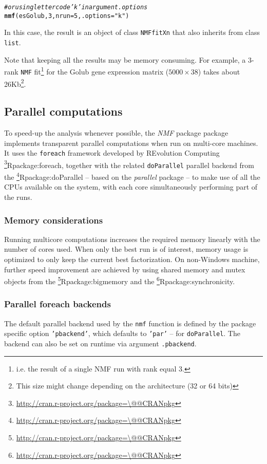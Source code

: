 \documentclass[a4paper]{article}\usepackage[]{graphicx}\usepackage[]{color}
\makeatletter
\newcommand{\hlnum}[1]{\textcolor[rgb]{0.686,0.059,0.569}{#1}}%
\newcommand{\hlstr}[1]{\textcolor[rgb]{0.192,0.494,0.8}{#1}}%
\newcommand{\hlcom}[1]{\textcolor[rgb]{0.678,0.584,0.686}{\textit{#1}}}%
\newcommand{\hlstd}[1]{\textcolor[rgb]{0.345,0.345,0.345}{#1}}%
\newcommand{\hlkwc}[1]{\textcolor[rgb]{0.333,0.667,0.333}{#1}}%
\newcommand{\hlkwd}[1]{\textcolor[rgb]{0.737,0.353,0.396}{\textbf{#1}}}%
\newenvironment{kframe}{%
 \def\at@end@of@kframe{}%
 \ifinner\ifhmode%
  \def\at@end@of@kframe{\end{minipage}}%
  \begin{minipage}{\columnwidth}%
 \fi\fi%
 \def\FrameCommand##1{\hskip\@totalleftmargin \hskip-\fboxsep
 \colorbox{shadecolor}{##1}\hskip-\fboxsep
     \hskip-\linewidth \hskip-\@totalleftmargin \hskip\columnwidth}%
 \MakeFramed {\advance\hsize-\width
   \@totalleftmargin\z@ \linewidth\hsize
   \@setminipage}}%
 {\par\unskip\endMakeFramed%
 \at@end@of@kframe}
\newenvironment{knitrout}{}{} %
\let\code=\texttt
\newcommand{\pkgname}[1]{\textit{#1}\xspace}
\newcommand{\Rpkg}[1]{\pkgname{#1} package\xspace}
\newcommand{\CRANurl}[1]{\url{http://cran.r-project.org/package=#1}}
\def\CRANpkg{\@ifstar\@CRANpkg\@@CRANpkg}
\def\@CRANpkg#1{\href{http://cran.r-project.org/package=#1}{\pkgname{#1}}\footnote{\CRANurl{#1}}}
\def\@@CRANpkg#1{\href{http://cran.r-project.org/package=#1}{\pkgname{#1}} package\footnote{\CRANurl{#1}}}
\def\citeCRANpkg{\@ifstar\@citeCRANpkg\@@citeCRANpkg}
\def\@citeCRANpkg#1{\CRANpkg{#1}\cite*{Rpackage:#1}}
\def\@@citeCRANpkg#1{\CRANpkg{#1}~\cite{Rpackage:#1}}
\newcommand{\nmfpack}{\Rpkg{NMF}}
\renewcommand{\cite}[1]{\parencite{#1}}
\makeatother
\begin{document}
\begin{knitrout}
\color{fgcolor}\begin{kframe}
\begin{alltt}
\hlcom{# or using letter code 'k' in argument .options}
\hlkwd{nmf}\hlstd{(esGolub,} \hlnum{3}\hlstd{,} \hlkwc{nrun} \hlstd{=} \hlnum{5}\hlstd{,} \hlkwc{.options} \hlstd{=} \hlstr{"k"}\hlstd{)}
\end{alltt}
\end{kframe}
\end{knitrout}


In this case, the result is an object of class \code{NMFfitXn} that also inherits from class \code{list}.

Note that keeping all the results may be memory consuming. 
For example, a 3-rank \code{NMF} fit\footnote{i.e. the result of a single NMF run with rank equal 3.} for the Golub gene expression matrix ($5000 \times 38$) takes about 26Kb\footnote{This size might change depending on the architecture (32 or 64 bits)}.

\subsection{Parallel computations}\label{multicore}

To speed-up the analysis whenever possible, the \nmfpack package implements transparent parallel computations when run on multi-core machines.
It uses the \code{foreach} framework developed by REvolution Computing
\citeCRANpkg{foreach}, together with the related \code{doParallel} parallel
backend from the \citeCRANpkg{doParallel} -- based on the
\pkgname{parallel} package -- to make use of all the CPUs available on the
system, with each core simultaneously performing part of the runs. 

\subsubsection{Memory considerations}
Running multicore computations increases the required memory linearly
with the number of cores used.
When only the best run is of interest, memory usage is
optimized to only keep the current best factorization.
On non-Windows machine, further speed improvement are achieved by using shared
memory and mutex objects from the \citeCRANpkg{bigmemory} and the 
\citeCRANpkg{synchronicity}.

\subsubsection{Parallel foreach backends}
The default parallel backend used by the \code{nmf} function is defined by the
package specific option \code{'pbackend'}, which defaults to \code{'par'} -- for
\code{doParallel}.
The backend can also be set on runtime via argument \code{.pbackend}.
\end{document}

